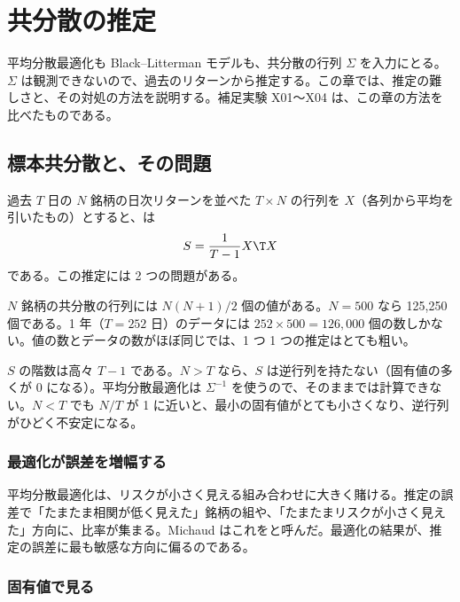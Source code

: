 \chapter{共分散の推定}\label{ch:cov}

平均分散最適化も Black--Litterman モデルも、共分散の行列 $\Sigma$ を入力にとる。$\Sigma$ は観測できないので、過去のリターンから推定する。この章では、推定の難しさと、その対処の方法を説明する。補足実験 X01〜X04 は、この章の方法を比べたものである。

\section{標本共分散と、その問題}

過去 $T$ 日の $N$ 銘柄の日次リターンを並べた $T\times N$ の行列を $X$（各列から平均を引いたもの）とすると、は
\begin{equation}
S = \frac{1}{T-1}X\T X
\end{equation}
である。この推定には 2 つの問題がある。

\begin{description}[leftmargin=1.5em,style=nextline,itemsep=0.4em]
\item[推定するものが多すぎる] $N$ 銘柄の共分散の行列には $N(N+1)/2$ 個の値がある。$N=500$ なら 125,250 個である。1 年（$T=252$ 日）のデータには $252\times500=126{,}000$ 個の数しかない。値の数とデータの数がほぼ同じでは、1 つ 1 つの推定はとても粗い。
\item[特異になる] $S$ の階数は高々 $T-1$ である。$N > T$ なら、$S$ は逆行列を持たない（固有値の多くが 0 になる）。平均分散最適化は $\Sigma^{-1}$ を使うので、そのままでは計算できない。$N<T$ でも $N/T$ が 1 に近いと、最小の固有値がとても小さくなり、逆行列がひどく不安定になる。
\end{description}

\subsection{最適化が誤差を増幅する}

平均分散最適化は、リスクが小さく見える組み合わせに大きく賭ける。推定の誤差で「たまたま相関が低く見えた」銘柄の組や、「たまたまリスクが小さく見えた」方向に、比率が集まる。Michaud はこれをと呼んだ。最適化の結果が、推定の誤差に最も敏感な方向に偏るのである。

\subsection{固有値で見る}

